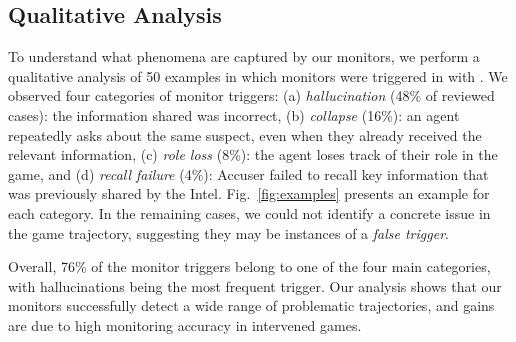 \subsection{Qualitative Analysis}

To understand what phenomena are captured by our monitors, we perform a qualitative analysis of 50 examples in which monitors were triggered in \ourenvasym{} with \llama{}. 
We observed four categories of monitor triggers: (a) \emph{hallucination} (48\% of reviewed cases): the information shared was incorrect, (b) \emph{collapse} (16\%): an agent repeatedly asks about the same suspect, even when they already received the relevant information, (c) \emph{role loss} (8\%): the agent loses track of their role in the game, and (d) \emph{recall failure} (4\%): Accuser failed to recall key information that was previously shared by the Intel.
Fig.~\ref{fig:examples} presents an example for each category.
In the remaining cases, we could not identify a concrete issue in the game trajectory, suggesting they may be instances of a \emph{false trigger}.


Overall, 76\% of the monitor triggers belong to one of the four main categories, with hallucinations being the most frequent trigger.
Our analysis shows that our monitors successfully detect a wide range of problematic trajectories, and gains are due to high monitoring accuracy in intervened games.
